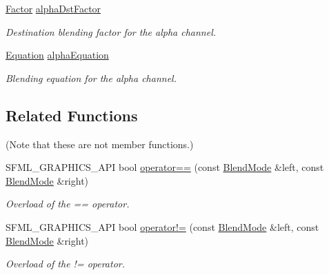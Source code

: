 \begin{DoxyCompactItemize}
\mbox{\label{structsf_1_1_blend_mode_aaf85b6b7943181cc81745569c4851e4e}} 
\hyperlink{structsf_1_1_blend_mode_afb9852caf356b53bb0de460c58a9ebbb}{Factor} \hyperlink{structsf_1_1_blend_mode_aaf85b6b7943181cc81745569c4851e4e}{alpha\+Dst\+Factor}
\begin{DoxyCompactList}\small\item\em Destination blending factor for the alpha channel. \end{DoxyCompactList}\item 
\mbox{\label{structsf_1_1_blend_mode_a68f5a305e0912946f39ba6c9265710c4}} 
\hyperlink{structsf_1_1_blend_mode_a7bce470e2e384c4f9c8d9595faef7c32}{Equation} \hyperlink{structsf_1_1_blend_mode_a68f5a305e0912946f39ba6c9265710c4}{alpha\+Equation}
\begin{DoxyCompactList}\small\item\em Blending equation for the alpha channel. \end{DoxyCompactList}\end{DoxyCompactItemize}
\subsection*{Related Functions}
(Note that these are not member functions.) \begin{DoxyCompactItemize}
\item 
S\+F\+M\+L\+\_\+\+G\+R\+A\+P\+H\+I\+C\+S\+\_\+\+A\+PI bool \hyperlink{structsf_1_1_blend_mode_ae13d2e80e55c5263eb9413fde7f74443}{operator==} (const \hyperlink{structsf_1_1_blend_mode}{Blend\+Mode} \&left, const \hyperlink{structsf_1_1_blend_mode}{Blend\+Mode} \&right)
\begin{DoxyCompactList}\small\item\em Overload of the == operator. \end{DoxyCompactList}\item 
S\+F\+M\+L\+\_\+\+G\+R\+A\+P\+H\+I\+C\+S\+\_\+\+A\+PI bool \hyperlink{structsf_1_1_blend_mode_a0c08bfcb9b6911104dcc0c0cddde522a}{operator!=} (const \hyperlink{structsf_1_1_blend_mode}{Blend\+Mode} \&left, const \hyperlink{structsf_1_1_blend_mode}{Blend\+Mode} \&right)
\begin{DoxyCompactList}\small\item\em Overload of the != operator. \end{DoxyCompactList}\end{DoxyCompactItemize}


